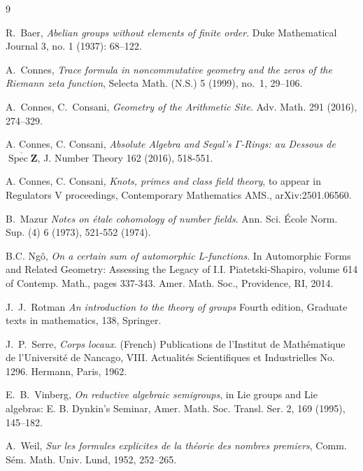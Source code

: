 \documentclass[11pt,a4paper]{article}
\newcommand{\Spec}{\operatorname{Spec}}
\theoremstyle{plain}
\theoremstyle{definition} %
\begin{document}
\fi

\begin{thebibliography}{9}

 R.~Baer, \emph{ Abelian groups without elements of finite order}. Duke Mathematical Journal 3, no. 1 (1937): 68--122.

 
A.~Connes, 
\emph{Trace formula in noncommutative geometry and the zeros of the Riemann zeta function}, 
Selecta Math. (N.S.) 5 (1999), no.~1, 29--106.

 A.~Connes, C.~Consani, {\em Geometry of the Arithmetic Site}. Adv. Math. 291 (2016), 274--329.

  A. Connes, C. Consani, \emph{Absolute Algebra and Segal's $\Gamma$-Rings: au Dessous de $\overline{\Spec \mathbf{Z}}$}, J. Number Theory 162 (2016), 518-551.

 A. Connes, C. Consani, \textit{Knots, primes and class field theory}, to appear in Regulators V proceedings, Contemporary Mathematics AMS., arXiv:2501.06560.


 B.~Mazur
\emph{ Notes on étale cohomology of number fields}. Ann. Sci. École Norm. Sup. (4) 6 (1973), 521-552 (1974). 

 B.C. Ng\^o, \emph{On a certain sum of automorphic L-functions}. In Automorphic Forms and
Related Geometry: Assessing the Legacy of I.I. Piatetski-Shapiro, volume 614 of Contemp. Math., pages 337-343. Amer. Math. Soc., Providence, RI, 2014.


 J.~J.~Rotman \emph{An introduction to the theory of groups} Fourth edition, Graduate texts in mathematics, 138, Springer.

 J.~P.~Serre, \emph{Corps locaux}. (French) Publications de l'Institut de Mathématique de l'Université de Nancago, VIII. Actualités Scientifiques et Industrielles  No. 1296. Hermann, Paris, 1962. 

  E.~B.~Vinberg, \emph{On reductive algebraic semigroups}, in Lie groups and Lie algebras: E. B. Dynkin's Seminar, Amer. Math. Soc. Transl. Ser. 2, 169 (1995), 145--182.


A.~Weil, 
\emph{Sur les formules explicites de la th\'eorie des nombres premiers}, 
Comm. S\'em. Math. Univ. Lund, 1952, 252--265.
\end{thebibliography}
\end{document}
